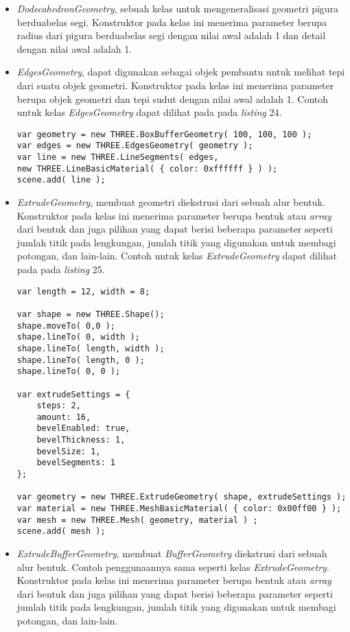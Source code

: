 \documentclass[a4paper,twoside]{article}
\begin{document}
\begin{enumerate}
\begin{itemize}
\begin{itemize}
	\item {\it DodecahedronGeometry}, sebuah kelas untuk mengeneralisasi geometri pigura berduabelas segi. Konstruktor pada kelas ini menerima parameter berupa radius dari pigura berduabelas segi dengan nilai awal adalah 1 dan detail dengan nilai awal adalah 1.

	\item {\it EdgesGeometry}, dapat digunakan sebagai objek pembantu untuk melihat tepi dari suatu objek geometri. Konstruktor pada kelas ini menerima parameter berupa objek geometri dan tepi sudut dengan nilai awal adalah 1. Contoh untuk kelas {\it EdgesGeometry} dapat dilihat pada pada {\it listing} 24.
	
\begin{lstlisting}[caption={Contoh penggunaan kelas {\it EdgesGeometry}.},captionpos=b]
var geometry = new THREE.BoxBufferGeometry( 100, 100, 100 );
var edges = new THREE.EdgesGeometry( geometry );
var line = new THREE.LineSegments( edges,
new THREE.LineBasicMaterial( { color: 0xffffff } ) );
scene.add( line );
\end{lstlisting}

	\item {\it ExtrudeGeometry}, membuat geometri diekstrusi dari sebuah alur bentuk. Konstruktor pada kelas ini menerima parameter berupa bentuk atau {\it array} dari bentuk dan juga pilihan yang dapat berisi beberapa parameter seperti jumlah titik pada lengkungan, jumlah titik yang digunakan untuk membagi potongan, dan lain-lain. Contoh untuk kelas {\it ExtrudeGeometry} dapat dilihat pada pada {\it listing} 25.
	
\begin{lstlisting}[caption={Contoh penggunaan kelas {\it ExtrudeGeometry}.},captionpos=b]
var length = 12, width = 8;

var shape = new THREE.Shape();
shape.moveTo( 0,0 );
shape.lineTo( 0, width );
shape.lineTo( length, width );
shape.lineTo( length, 0 );
shape.lineTo( 0, 0 );

var extrudeSettings = {
	steps: 2,
	amount: 16,
	bevelEnabled: true,
	bevelThickness: 1,
	bevelSize: 1,
	bevelSegments: 1
};

var geometry = new THREE.ExtrudeGeometry( shape, extrudeSettings );
var material = new THREE.MeshBasicMaterial( { color: 0x00ff00 } );
var mesh = new THREE.Mesh( geometry, material ) ;
scene.add( mesh );
\end{lstlisting}

	\item {\it ExtrudeBufferGeometry}, membuat {\it BufferGeometry} diekstrusi dari sebuah alur bentuk. Contoh penggunaannya sama seperti kelas {\it ExtrudeGeometry}. Konstruktor pada kelas ini menerima parameter berupa bentuk atau {\it array} dari bentuk dan juga pilihan yang dapat berisi beberapa parameter seperti jumlah titik pada lengkungan, jumlah titik yang digunakan untuk membagi potongan, dan lain-lain.


\end{itemize}
\end{itemize}
\end{enumerate}
\end{document}
